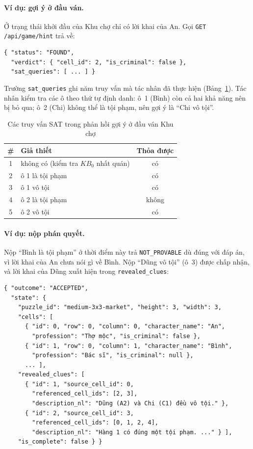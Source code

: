\paragraph{Ví dụ: gợi ý ở đầu ván.}
Ở trạng thái khởi đầu của Khu chợ chỉ có lời khai của An. Gọi
\texttt{GET /api/game/hint} trả về:
\begingroup\footnotesize
\begin{verbatim}
{ "status": "FOUND",
  "verdict": { "cell_id": 2, "is_criminal": false },
  "sat_queries": [ ... ] }
\end{verbatim}
\endgroup
\noindent Trường \texttt{sat\_queries} ghi năm truy vấn mà tác nhân đã thực hiện
(Bảng~\ref{tab:hint_queries}). Tác nhân kiểm tra các ô theo thứ tự định danh:
ô~1 (Bình) còn cả hai khả năng nên bị bỏ qua; ô~2 (Chi) không thể là tội phạm,
nên gợi ý là ``Chi vô tội''.

\begin{table}[htbp]
  \centering\small
  \caption{Các truy vấn SAT trong phản hồi gợi ý ở đầu ván Khu chợ}
  \label{tab:hint_queries}
  \begin{tabular}{clc}
    \toprule
    \textbf{\#} & \textbf{Giả thiết} & \textbf{Thỏa được} \\
    \midrule
    1 & không có (kiểm tra $\mathit{KB}_0$ nhất quán) & có \\
    2 & ô 1 là tội phạm  & có \\
    3 & ô 1 vô tội       & có \\
    4 & ô 2 là tội phạm  & không \\
    5 & ô 2 vô tội       & có \\
    \bottomrule
  \end{tabular}
\end{table}

\paragraph{Ví dụ: nộp phán quyết.}
Nộp ``Bình là tội phạm'' ở thời điểm này trả \texttt{NOT\_PROVABLE} dù đúng
với đáp án, vì lời khai của An chưa nói gì về Bình. Nộp ``Dũng vô tội''
(ô~3) được chấp nhận, và lời
khai của Dũng xuất hiện trong \texttt{revealed\_clues}:
\begingroup\footnotesize
\begin{verbatim}
{ "outcome": "ACCEPTED",
  "state": {
    "puzzle_id": "medium-3x3-market", "height": 3, "width": 3,
    "cells": [
      { "id": 0, "row": 0, "column": 0, "character_name": "An",
        "profession": "Thợ mộc", "is_criminal": false },
      { "id": 1, "row": 0, "column": 1, "character_name": "Bình",
        "profession": "Bác sĩ", "is_criminal": null },
      ... ],
    "revealed_clues": [
      { "id": 1, "source_cell_id": 0,
        "referenced_cell_ids": [2, 3],
        "description_nl": "Dũng (A2) và Chi (C1) đều vô tội." },
      { "id": 2, "source_cell_id": 3,
        "referenced_cell_ids": [0, 1, 2, 4],
        "description_nl": "Hàng 1 có đúng một tội phạm. ..." } ],
    "is_complete": false } }
\end{verbatim}
\endgroup

